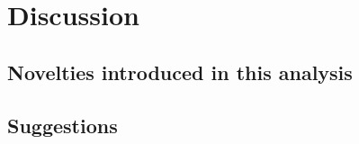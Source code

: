 \chapter{Discussion}
\label{ch:discussion}

\section{Novelties introduced in this analysis}
\label{sec:discussion_novelties}

\section{Suggestions}
\label{sec:discussion_suggestions}